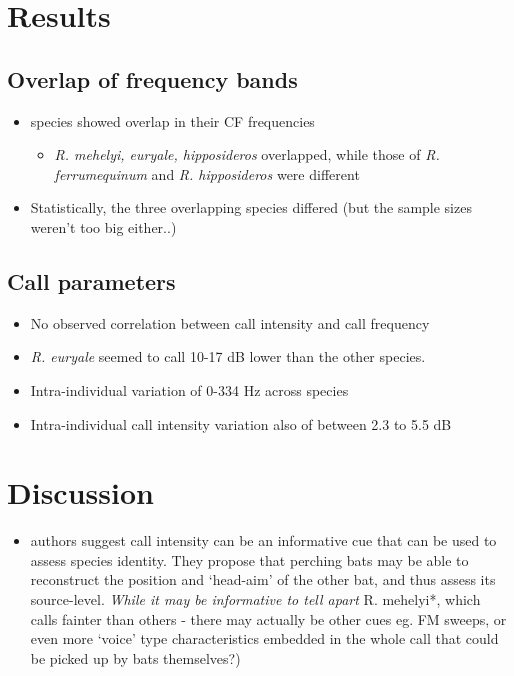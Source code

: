 \documentclass[
]{book}
\providecommand{\tightlist}{%
  \setlength{\itemsep}{0pt}\setlength{\parskip}{0pt}}
\begin{document}
\hypertarget{results-7}{%
\section{Results}\label{results-7}}

\hypertarget{overlap-of-frequency-bands}{%
\subsection{Overlap of frequency bands}\label{overlap-of-frequency-bands}}

\begin{itemize}
\tightlist
\item
  species showed overlap in their CF frequencies

  \begin{itemize}
  \tightlist
  \item
    \emph{R. mehelyi, euryale, hipposideros} overlapped, while those of \emph{R. ferrumequinum} and \emph{R. hipposideros} were different
  \end{itemize}
\item
  Statistically, the three overlapping species differed (but the sample sizes weren't too big either..)
\end{itemize}

\hypertarget{call-parameters}{%
\subsection{Call parameters}\label{call-parameters}}

\begin{itemize}
\tightlist
\item
  No observed correlation between call intensity and call frequency
\item
  \emph{R. euryale} seemed to call 10-17 dB lower than the other species.
\item
  Intra-individual variation of 0-334 Hz across species
\item
  Intra-individual call intensity variation also of between 2.3 to 5.5 dB
\end{itemize}

\hypertarget{discussion-2}{%
\section{Discussion}\label{discussion-2}}

\begin{itemize}
\tightlist
\item
  authors suggest call intensity can be an informative cue that can be used to assess species identity. They propose that perching bats may be able to reconstruct the position and `head-aim' of the other bat, and thus assess its source-level. \emph{While it may be informative to tell apart }R. mehelyi*, which calls fainter than others - there may actually be other cues eg. FM sweeps, or even more `voice' type characteristics embedded in the whole call that could be picked up by bats themselves?)
\end{itemize}
\end{document}
